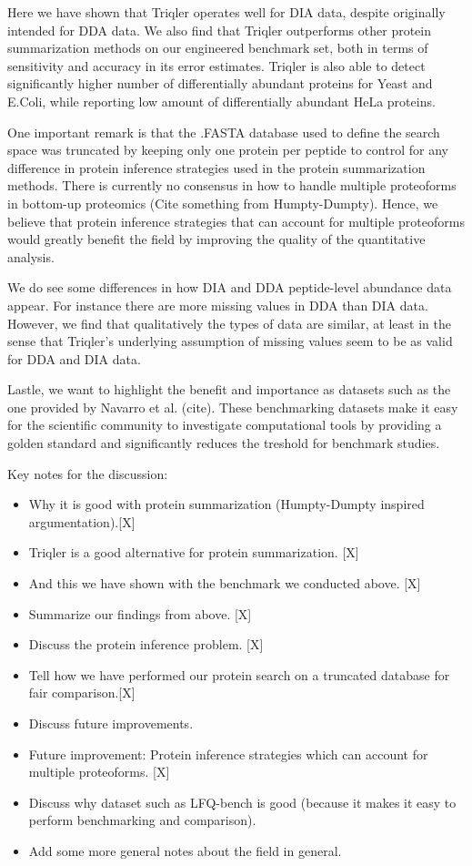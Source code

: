 \documentclass[10pt,letterpaper]{article}
\begin{document}
Here we have shown that Triqler operates well for DIA data, despite originally intended for DDA data. We also find that Triqler outperforms other protein summarization methods on our engineered benchmark set, both in terms of sensitivity and accuracy in its error estimates. Triqler is also able to detect significantly higher number of differentially abundant proteins for Yeast and E.Coli, while reporting low amount of differentially abundant HeLa proteins. 

One important remark is that the .FASTA database used to define the search space was truncated by keeping only one protein per peptide to control for any difference in protein inference strategies used in the protein summarization methods. There is currently no consensus in how to handle multiple proteoforms in bottom-up proteomics (Cite something from Humpty-Dumpty). Hence, we believe that protein inference strategies that can account for multiple proteoforms would greatly benefit the field by improving the quality of the quantitative analysis. 

We do see some differences in how DIA and DDA peptide-level abundance data appear. For instance there are more missing values in DDA than DIA data. However, we find that qualitatively the types of data are similar, at least in the sense that Triqler's underlying assumption of missing values seem to be as valid for DDA and DIA data.

Lastle, we want to highlight the benefit and importance as datasets such as the one provided by Navarro et al. (cite). These benchmarking datasets make it easy for the scientific community to investigate computational tools by providing a golden standard and significantly reduces the treshold for benchmark studies. 





Key notes for the discussion:
\begin{itemize}
  \item Why it is good with protein summarization (Humpty-Dumpty inspired argumentation).[X] 
  \item Triqler is a good alternative for protein summarization. [X]
  \item And this we have shown with the benchmark we conducted above. [X]
  \item Summarize our findings from above. [X]
  \item Discuss the protein inference problem. [X] 
  \item Tell how we have performed our protein search on a truncated database for fair comparison.[X]
  \item Discuss future improvements.
  \item Future improvement: Protein inference strategies which can account for multiple proteoforms. [X]
  \item Discuss why dataset such as LFQ-bench is good (because it makes it easy to perform benchmarking and comparison).
  \item Add some more general notes about the field in general.
\end{itemize}
\end{document}
